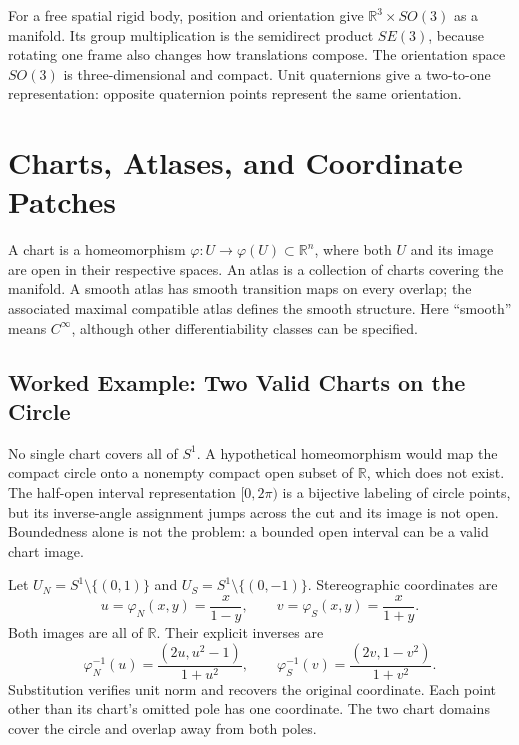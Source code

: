 For a free spatial rigid body, position and orientation give $\mathbb R^3\times SO(3)$ as a manifold. Its group multiplication is the semidirect product $SE(3)$, because rotating one frame also changes how translations compose. The orientation space $SO(3)$ is three-dimensional and compact. Unit quaternions give a two-to-one representation: opposite quaternion points represent the same orientation.

\section{Charts, Atlases, and Coordinate Patches}
\label{sec:charts}
\label{def:atlas}
\label{def:chart}

A chart is a homeomorphism $\varphi:U\to\varphi(U)\subset\mathbb R^n$, where both $U$ and its image are open in their respective spaces. An atlas is a collection of charts covering the manifold. A smooth atlas has smooth transition maps on every overlap; the associated maximal compatible atlas defines the smooth structure. Here ``smooth'' means $C^\infty$, although other differentiability classes can be specified.

\subsection{Worked Example: Two Valid Charts on the Circle}
\label{example:circle_charts}
\label{ex:ex_circle_charts}

No single chart covers all of $S^1$. A hypothetical homeomorphism would map the compact circle onto a nonempty compact open subset of $\mathbb R$, which does not exist. The half-open interval representation $[0,2\pi)$ is a bijective labeling of circle points, but its inverse-angle assignment jumps across the cut and its image is not open. Boundedness alone is not the problem: a bounded open interval can be a valid chart image.

Let $U_N=S^1\setminus\{(0,1)\}$ and $U_S=S^1\setminus\{(0,-1)\}$. Stereographic coordinates are
\begin{equation}
 u=\varphi_N(x,y)=\frac{x}{1-y},\qquad
 v=\varphi_S(x,y)=\frac{x}{1+y}.
\end{equation}
Both images are all of $\mathbb R$. Their explicit inverses are
\begin{equation}
 \varphi_N^{-1}(u)=\frac{(2u,u^2-1)}{1+u^2},\qquad
 \varphi_S^{-1}(v)=\frac{(2v,1-v^2)}{1+v^2}.
\end{equation}
Substitution verifies unit norm and recovers the original coordinate. Each point other than its chart's omitted pole has one coordinate. The two chart domains cover the circle and overlap away from both poles.

